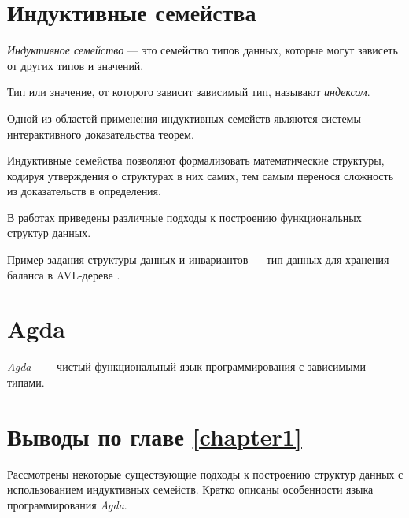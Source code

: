 \section{Индуктивные семейства}

\begin{definition}
\emph{Индуктивное семейство} \cite{DybjerIndFam}— это семейство типов данных,
которые могут зависеть от других типов и значений.

Тип или значение, от которого зависит зависимый тип, называют \emph{индексом}.
\end{definition}

Одной из областей применения индуктивных семейств являются системы интерактивного
доказательства теорем.

Индуктивные семейства позволяют формализовать математические структуры,
кодируя утверждения о структурах в них самих, тем самым перенося сложность из
доказательств в определения.

В работах \cite{OkasakiThesis, McBridePivotal} приведены различные подходы
к построению функциональных структур данных.

Пример задания структуры данных и инвариантов —
тип данных для хранения баланса в AVL-дереве \cite{AVLTree}.
\newline


\section{Agda}
\textit{Agda}~\cite{AgdaLang}~---  чистый функциональный язык программирования с зависимыми типами.


\section{Выводы по главе \ref{chapter1}}
Рассмотрены некоторые существующие подходы к построению структур данных
с использованием индуктивных семейств.
Кратко описаны особенности языка программирования \textit{Agda}.

